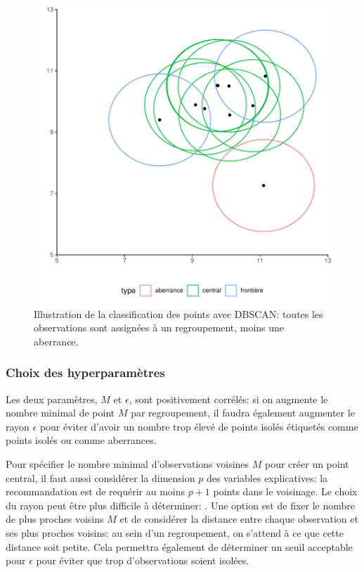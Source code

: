 \documentclass[
  11pt,
  letterpaper,
]{scrbook}
\theoremstyle{definition}
\theoremstyle{remark}
\begin{document}
\begin{figure}[ht!]

{\centering \includegraphics{./03-regroupements_files/figure-pdf/fig-dbscan1-1.pdf}

}

\caption{\label{fig-dbscan1}Illustration de la classification des points
avec DBSCAN: toutes les observations sont assignées à un regroupement,
moins une aberrance.}

\end{figure}

\hypertarget{choix-des-hyperparamuxe8tres-1}{%
\subsubsection{Choix des
hyperparamètres}\label{choix-des-hyperparamuxe8tres-1}}

Les deux paramètres, \(M\) et \(\epsilon\), sont positivement corrélés:
si on augmente le nombre minimal de point \(M\) par regroupement, il
faudra également augmenter le rayon \(\epsilon\) pour éviter d'avoir un
nombre trop élevé de points isolés étiquetés comme points isolés ou
comme aberrances.

Pour spécifier le nombre minimal d'observations voisines \(M\) pour
créer un point central, il faut aussi considérer la dimension \(p\) des
variables explicatives: la recommandation est de requérir au moins
\(p+1\) points dans le voisinage. Le choix du rayon peut être plus
difficile à déterminer: . Une option est de fixer le nombre de plus
proches voisins \(M\) et de considérer la distance entre chaque
observation et ses plus proches voisins: au sein d'un regroupement, on
s'attend à ce que cette distance soit petite. Cela permettra également
de déterminer un seuil acceptable pour \(\epsilon\) pour éviter que trop
d'observations soient isolées.
\end{document}
